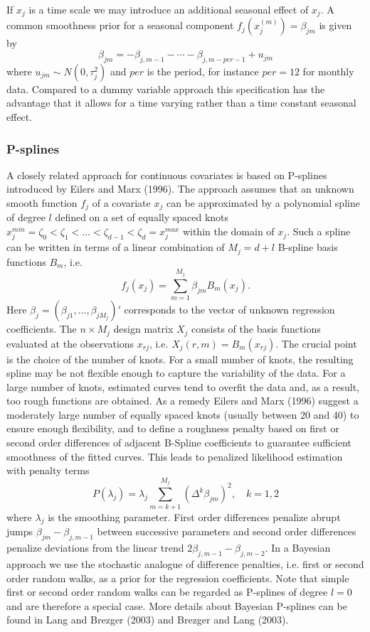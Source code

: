 \documentclass[11pt,a4paper,twoside]{bayesxarticle}
\begin{document}
If $x_j$ is a time  scale we may introduce an additional seasonal
effect of $x_j$. A common smoothness prior for a seasonal
component $f_j(x_j^{(m)}) = \beta_{jm}$ is given by
\begin{equation}
\beta_{jm} = -\beta_{j,m-1} - \cdots -
\beta_{j,m-per-1}+u_{jm}\label{seasonal}
\end{equation}
where $u_{jm}\sim N(0,\tau_j^{2})$ and $per$ is the period, for
instance $per = 12$ for monthly data. Compared to a dummy variable
approach this specification has the advantage that it allows for a
time varying rather than a time constant seasonal effect.


\subsubsection{P-splines}

A closely related approach for continuous covariates is based on
P-splines introduced by Eilers and Marx (1996). The approach
assumes that an unknown smooth function $f_j$ of a covariate $x_j$
can be approximated by a polynomial spline of degree $l$ defined
on a set of equally spaced knots $x_j^{min} = \zeta_{0}  <
\zeta_{1} < \dots < \zeta_{d-1} < \zeta_{d} = x_j^{max}$ within
the domain of $x_j$. Such a spline can be written in terms of a
linear combination of $M_j = d+l$ B-spline basis functions
$B_{m}$, i.e.
$$
f_j(x_j) = \sum_{m=1}^{M_j} \beta_{jm} B_{m}(x_j).
$$
Here $\beta_j = (\beta_{j1},\dots,\beta_{jM_j})'$ corresponds to
the vector of unknown regression coefficients. The $n \times M_j$
design matrix $X_j$ consists of the basis functions evaluated at
the observations $x_{rj}$, i.e. $X_j(r,m) = B_m(x_{rj})$. The
crucial point is the choice of the number of knots. For a small
number of knots, the resulting spline may be not flexible enough
to capture the variability of the data. For a large number of
knots, estimated curves tend to overfit the data and, as a result,
too rough functions are obtained. As a remedy Eilers and Marx
(1996) suggest a moderately large number of equally spaced knots
(usually between 20 and 40) to ensure enough flexibility, and to
define a roughness penalty based on first or second order
differences of adjacent B-Spline coefficients to guarantee
sufficient smoothness of the fitted curves. This leads to
penalized likelihood estimation with penalty terms
\begin{equation}
\label{diffpenalty} P(\lambda_j) = \lambda_j \sum_{m=k+1}^{M_j}
(\Delta^k \beta_{jm})^2 , \quad k=1,2
\end{equation}
where $\lambda_j$ is the smoothing parameter. First order
differences penalize abrupt jumps $\beta_{jm}-\beta_{j,m-1}$
between successive parameters and second order differences
penalize deviations from the linear trend $2
\beta_{j,m-1}-\beta_{j,m-2}$. In a Bayesian approach we use the
stochastic analogue of difference penalties, i.e. first or second
order random walks, as a prior for the regression coefficients.
Note that simple first or second order random walks can be
regarded as P-splines of degree $l=0$ and are therefore a special
case. More details about Bayesian P-splines can be found in Lang
and Brezger (2003) and Brezger and Lang (2003).
\end{document}
